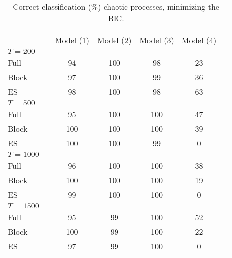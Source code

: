 \documentclass[12pt]{article}
\begin{document}
\begin{table} [H]\scriptsize
    \caption{ Correct classification (\%) chaotic processes, minimizing the BIC.}
    \begin{tabular*}{\textwidth}{@{\extracolsep{\fill}}lcccccc}
        \hline &  &  &  & &   \\ 
        &  &  Model (1) & Model (2)  & Model (3) & Model (4) \\ 
        $T=200$  &  &  &  & &   \\
        Full                      &   & 94 & 100 & 98  & 23 \\ 
        Block                     &   & 97 & 100 & 99  & 36\\ 
        ES                        &   & 98 & 100 & 98  & 63 \\ 
        \hline 
        $T=500$  &  &   & & &    \\ 
        
        Full                      &  & 95 & 100 &  100  & 47 \\ 
        Block                     &  & 100 & 100 &  100 & 39 \\ 
        ES                        &  & 100 & 100 &  99 & 0\\ 
        \hline 
        $T=1000$  &  &   &   &  &    \\ 
        
        Full                      & & 96 & 100 &  100 & 38\\ 
        Block                     & & 100 & 100 & 100 & 19\\ 
        ES                        & & 99 & 100 & 100 & 0\\ 
        \hline      
        $T=1500$  &  &   &   &  &   \\ 
        
        Full                      &   & 95 & 99 & 100 & 52 \\ 
        Block                     &   & 100 & 99 & 100 & 22  \\ 
        ES                        &   & 97 & 99 & 100 & 0  \\ 
        \hline      
    \end{tabular*}
\end{table}
\end{document}
